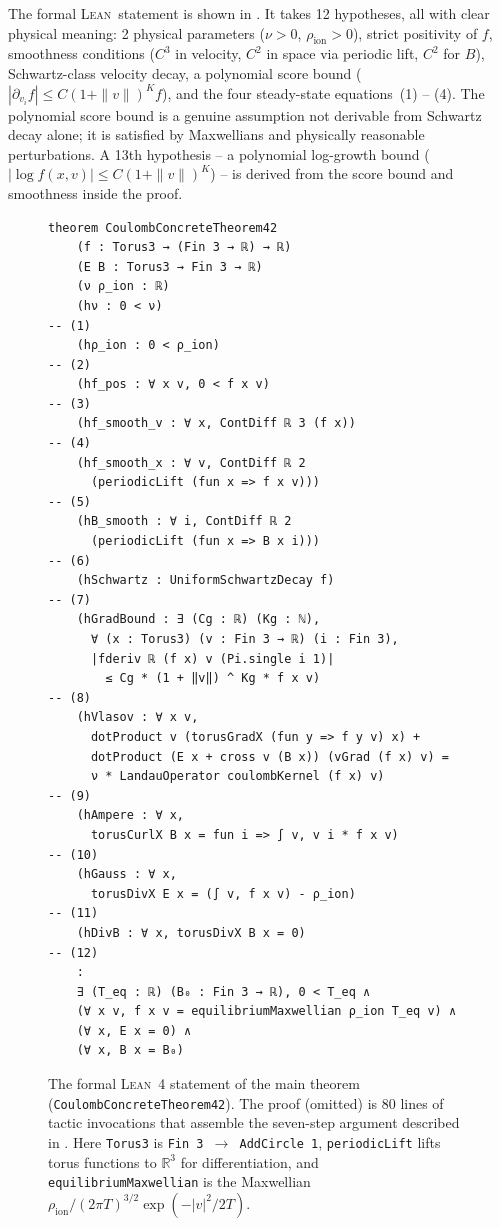 \documentclass[11pt]{article}
\newcommand{\lean}{\textsc{Lean}}
\newcommand{\RR}{\mathbb{R}}
\begin{document}
The formal \lean\ statement is shown in . It takes 12 hypotheses, all with clear physical meaning: 2 physical parameters ($\nu > 0$, $\rho_{\mathrm{ion}} > 0$), strict positivity of $f$, smoothness conditions ($C^3$ in velocity, $C^2$ in space via periodic lift, $C^2$ for $B$), Schwartz-class velocity decay, a polynomial score bound ($|\partial_{v_i} f| \leq C(1+\|v\|)^K f$), and the four steady-state equations~(1) -- (4). The polynomial score bound is a genuine assumption not derivable from Schwartz decay alone; it is satisfied by Maxwellians and physically reasonable perturbations. A 13th hypothesis -- a polynomial log-growth bound ($|\log f(x,v)| \leq C(1+\|v\|)^K$) -- is derived from the score bound and smoothness inside the proof.

\begin{figure}[t]
\begin{lstlisting}
theorem CoulombConcreteTheorem42
    (f : Torus3 → (Fin 3 → ℝ) → ℝ)
    (E B : Torus3 → Fin 3 → ℝ)
    (ν ρ_ion : ℝ)
    (hν : 0 < ν)                                             -- (1)
    (hρ_ion : 0 < ρ_ion)                                     -- (2)
    (hf_pos : ∀ x v, 0 < f x v)                             -- (3)
    (hf_smooth_v : ∀ x, ContDiff ℝ 3 (f x))                  -- (4)
    (hf_smooth_x : ∀ v, ContDiff ℝ 2
      (periodicLift (fun x => f x v)))                        -- (5)
    (hB_smooth : ∀ i, ContDiff ℝ 2
      (periodicLift (fun x => B x i)))                        -- (6)
    (hSchwartz : UniformSchwartzDecay f)                      -- (7)
    (hGradBound : ∃ (Cg : ℝ) (Kg : ℕ),
      ∀ (x : Torus3) (v : Fin 3 → ℝ) (i : Fin 3),
      |fderiv ℝ (f x) v (Pi.single i 1)|
        ≤ Cg * (1 + ‖v‖) ^ Kg * f x v)                      -- (8)
    (hVlasov : ∀ x v,
      dotProduct v (torusGradX (fun y => f y v) x) +
      dotProduct (E x + cross v (B x)) (vGrad (f x) v) =
      ν * LandauOperator coulombKernel (f x) v)               -- (9)
    (hAmpere : ∀ x,
      torusCurlX B x = fun i => ∫ v, v i * f x v)           -- (10)
    (hGauss : ∀ x,
      torusDivX E x = (∫ v, f x v) - ρ_ion)                 -- (11)
    (hDivB : ∀ x, torusDivX B x = 0)                        -- (12)
    :
    ∃ (T_eq : ℝ) (B₀ : Fin 3 → ℝ), 0 < T_eq ∧
    (∀ x v, f x v = equilibriumMaxwellian ρ_ion T_eq v) ∧
    (∀ x, E x = 0) ∧
    (∀ x, B x = B₀)
\end{lstlisting}
\caption{The formal \lean~4 statement of the main theorem (\texttt{CoulombConcreteTheorem42}). The proof (omitted) is 80 lines of tactic invocations that assemble the seven-step argument described in . Here \texttt{Torus3} is \texttt{Fin\,3\,$\to$\,AddCircle\,1}, \texttt{periodicLift} lifts torus functions to $\RR^3$ for differentiation, and \texttt{equilibriumMaxwellian} is the Maxwellian $\rho_{\mathrm{ion}}/(2\pi T)^{3/2}\exp(-|v|^2/2T)$.}
\label{fig:lean-statement}
\end{figure}
\end{document}
